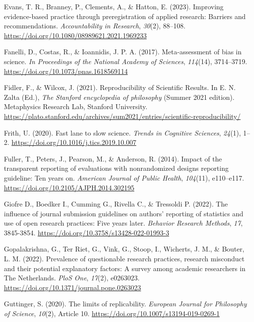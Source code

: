 \documentclass[authordate, meta]{jote-new-article}
\begin{document}
	Evans, T. R., Branney, P., Clements, A., \& Hatton, E. (2023). Improving evidence-based practice through preregistration of applied research: Barriers and recommendations. \emph{Accountability in Research}, \emph{30}(2), 88--108. \url{https://doi.org/10.1080/08989621.2021.1969233}



	Fanelli, D., Costas, R., \& Ioannidis, J. P. A. (2017). Meta-assessment of bias in science. \emph{In Proceedings of the National Academy of Sciences}, \emph{114}(14), 3714--3719. \url{https://doi.org/10.1073/pnas.1618569114}



	Fidler, F., \& Wilcox, J. (2021). Reproducibility of Scientific Results. In E. N. Zalta (Ed.), \emph{The Stanford encyclopedia of philosophy} (Summer 2021 edition). Metaphysics Research Lab, Stanford University. \url{https://plato.stanford.edu/archives/sum2021/entries/scientific-reproducibility/}



	Frith, U. (2020). Fast lane to slow science. \emph{Trends in Cognitive Sciences}, \emph{24}(1), 1--2. \url{https://doi.org/10.1016/j.tics.2019.10.007}



	Fuller, T., Peters, J., Pearson, M., \& Anderson, R. (2014). Impact of the transparent reporting of evaluations with nonrandomized designs reporting guideline: Ten years on. \emph{American Journal of Public Health}, \emph{104}(11), e110--e117. \url{https://doi.org/10.2105/AJPH.2014.302195}



	Giofre D., Boedker I., Cumming G., Rivella C., \& Tressoldi P. (2022). The influence of journal submission guidelines on authors' reporting of statistics and use of open research practices: Five years later. \emph{Behavior Research Methods}, \emph{17}, 3845-3854. \url{https://doi.org/10.3758/s13428-022-01993-3}



	Gopalakrishna, G., Ter Riet, G., Vink, G., Stoop, I., Wicherts, J. M., \& Bouter, L. M. (2022). Prevalence of questionable research practices, research misconduct and their potential explanatory factors: A survey among academic researchers in The Netherlands. \emph{PloS One}, \emph{17}(2), e0263023. \url{https://doi.org/10.1371/journal.pone.0263023}



	Guttinger, S. (2020). The limits of replicability. \emph{European Journal for Philosophy of Science}, \emph{10}(2), Article 10. \url{https://doi.org/10.1007/s13194-019-0269-1}
\end{document}
